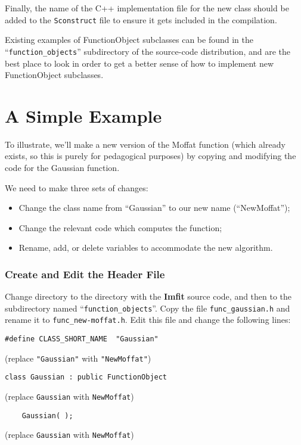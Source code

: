 \documentclass[10pt,a4paper,article]{memoir}
\newcommand{\imfit}{\textbf{Imfit}}
\begin{document}
Finally, the name of the C++ implementation file for the new class should be added
to the \texttt{Sconstruct} file to ensure it gets included in the compilation.

Existing examples of FunctionObject subclasses can be found in the ``\texttt{function\_objects}''
subdirectory of the source-code distribution, and are the best place to look in order
to get a better sense of how to implement new FunctionObject subclasses.


\section{A Simple Example}

To illustrate, we'll make a new version of the Moffat function (which already
exists, so this is purely for pedagogical purposes) by copying and modifying the
code for the Gaussian function.

\bigskip

We need to make three sets of changes:
\begin{itemize}
\item Change the class name from ``Gaussian'' to our new name (``NewMoffat'');
\item Change the relevant code which computes the function;
\item Rename, add, or delete variables to accommodate the new algorithm.
\end{itemize}


\subsubsection{Create and Edit the Header File}

Change directory to the directory with the \imfit{} source code, and then
to the subdirectory named ``\texttt{function\_objects}''. Copy the file
\texttt{func\_gaussian.h} and rename it to \texttt{func\_new-moffat.h}. Edit
this file and change the following lines:

\begin{verbatim}
#define CLASS_SHORT_NAME  "Gaussian"
\end{verbatim} 
(replace \texttt{"Gaussian"} with \texttt{"NewMoffat"})

\begin{verbatim}
class Gaussian : public FunctionObject
\end{verbatim}
(replace \texttt{Gaussian} with \texttt{NewMoffat})

\begin{verbatim}
    Gaussian( );
\end{verbatim}
(replace \texttt{Gaussian} with \texttt{NewMoffat})
\end{document}

